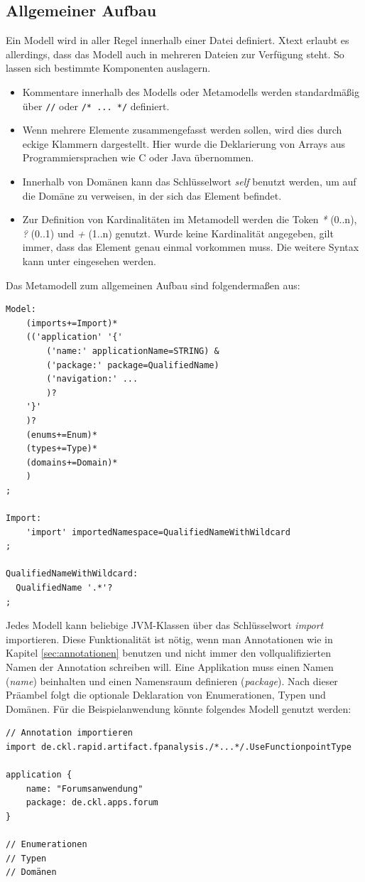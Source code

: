\documentclass[a4paper,12pt]{scrreprt}
\begin{document}
\subsection{Allgemeiner Aufbau}
Ein Modell wird in aller Regel innerhalb einer Datei definiert. Xtext erlaubt es allerdings, dass das Modell auch in mehreren Dateien zur Verfügung steht. So lassen sich bestimmte Komponenten auslagern. 
\begin{itemize}
	\item Kommentare innerhalb des Modells oder Metamodells werden standardmäßig über \verb+//+ oder \verb+/* ... */+ definiert.
	\item Wenn mehrere Elemente zusammengefasst werden sollen, wird dies durch eckige Klammern dargestellt. Hier wurde die Deklarierung von Arrays aus Programmiersprachen wie C oder Java übernommen.
	\item Innerhalb von Domänen kann das Schlüsselwort \textit{self} benutzt werden, um auf die Domäne zu verweisen, in der sich das Element befindet.
	\item Zur Definition von Kardinalitäten im Metamodell werden die Token \textit{*} (0..n), \textit{?} (0..1) und \textit{+} (1..n) genutzt. Wurde keine Kardinalität angegeben, gilt immer, dass das Element genau einmal vorkommen muss. Die weitere Syntax kann unter \cite{xtextDocumentation} eingesehen werden.
\end{itemize}
Das Metamodell zum allgemeinen Aufbau sind folgendermaßen aus:
\begin{verbatim}
Model:
    (imports+=Import)*
    (('application' '{'
        ('name:' applicationName=STRING) &
        ('package:' package=QualifiedName)
        ('navigation:' ...
        )?
    '}'
    )?
    (enums+=Enum)*
    (types+=Type)*
    (domains+=Domain)* 
    )
;

Import:
	'import' importedNamespace=QualifiedNameWithWildcard
;

QualifiedNameWithWildcard:
  QualifiedName '.*'?
;
\end{verbatim}
Jedes Modell kann beliebige JVM-Klassen über das Schlüsselwort \textit{import} importieren. Diese Funktionalität ist nötig, wenn man Annotationen wie in Kapitel \ref{sec:annotationen} benutzen und nicht immer den vollqualifizierten Namen der Annotation schreiben will.
Eine Applikation muss einen Namen (\textit{name}) beinhalten und einen Namensraum definieren (\textit{package}).
Nach dieser Präambel folgt die optionale Deklaration von Enumerationen, Typen und Domänen.
Für die Beispielanwendung könnte folgendes Modell genutzt werden:
\begin{verbatim}
// Annotation importieren
import de.ckl.rapid.artifact.fpanalysis./*...*/.UseFunctionpointType

application {
    name: "Forumsanwendung"
    package: de.ckl.apps.forum
}

// Enumerationen
// Typen
// Domänen
\end{verbatim}
\end{document}
